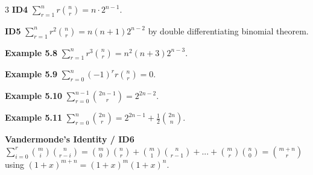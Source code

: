 \documentclass[10pt, landscape]{article}
\begin{document}
\begin{multicols*}{3}
\textbf{ID4} $\sum_{r=1}^nr{n \choose r}=n\cdot 2^{n-1}$.

\textbf{ID5} $\sum_{r=1}^n r^2{n \choose r}=n(n+1)2^{n-2}$ by double differentiating binomial theorem.

\textbf{Example 5.8} $\sum_{r=1}^n r^3{n \choose r}=n^2(n+3)2^{n-3}$.

\textbf{Example 5.9} $\sum_{r=0}^n(-1)^rr{n \choose r}=0$.

\textbf{Example 5.10} $\sum_{r=0}^{n-1}{2n-1\choose r}=2^{2n-2}$.

\textbf{Example 5.11} $\sum_{r=0}^n{2n \choose r}=2^{2n-1}+\frac{1}{2}{2n \choose n}$.

\textbf{Vandermonde's Identity / ID6} $\sum_{i=0}^r{m \choose i}{n \choose r-i}={m\choose 0}{n \choose r}+{m \choose 1}{n \choose r-1}+...+{m \choose r}{n \choose 0}={m+n \choose r}$ using $(1+x)^{m+n}=(1+x)^m(1+x)^n$.

\end{multicols*}
\end{document}
